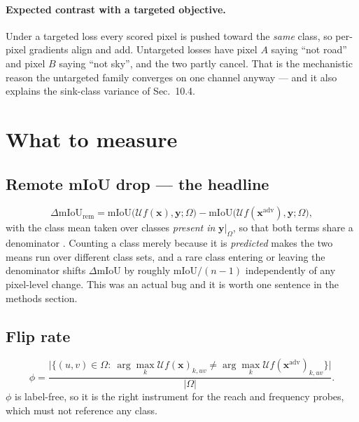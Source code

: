 \documentclass[11pt,a4paper]{article}
\begin{document}
\paragraph{Expected contrast with a targeted objective.}
Under a targeted loss every scored pixel is pushed toward the \emph{same}
class, so per-pixel gradients align and add. Untargeted losses have pixel
$A$ saying ``not road'' and pixel $B$ saying ``not sky'', and the two partly
cancel. That is the mechanistic reason the untargeted family converges on
one channel anyway --- and it also explains the sink-class variance of
Sec.~10.4.

\section{What to measure}

\subsection{Remote mIoU drop --- the headline}

\begin{equation}
  \Delta\mathrm{mIoU}_{\mathrm{rem}}
  = \mathrm{mIoU}\big(\mathcal{U}f(\mathbf{x}),\mathbf{y};\Omega\big)
  - \mathrm{mIoU}\big(\mathcal{U}f(\mathbf{x}^{\mathrm{adv}}),
     \mathbf{y};\Omega\big),
  \label{eq:drop}
\end{equation}
with the class mean taken over classes \emph{present in}
$\mathbf{y}|_\Omega$, so that both terms share a denominator
\citep{cordts2016cityscapes}. Counting a class merely because it is
\emph{predicted} makes the two means run over different class sets, and a
rare class entering or leaving the denominator shifts
$\Delta\mathrm{mIoU}$ by roughly $\mathrm{mIoU}/(n-1)$ independently of any
pixel-level change. This was an actual bug and it is worth one sentence in
the methods section.

\subsection{Flip rate}

\begin{equation}
  \phi = \frac{\big|\{(u,v)\in\Omega:\
     \arg\max_k \mathcal{U}f(\mathbf{x})_{k,uv}
     \neq \arg\max_k \mathcal{U}f(\mathbf{x}^{\mathrm{adv}})_{k,uv}\}\big|}
     {|\Omega|} .
  \label{eq:flip}
\end{equation}
$\phi$ is label-free, so it is the right instrument for the reach and
frequency probes, which must not reference any class.
\end{document}
